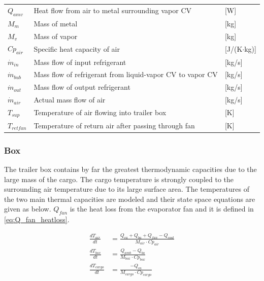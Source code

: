 \begin{center}
\begin{tabular}{l p{10cm} l}
		$Q_{amv}$        & Heat flow from air to metal surrounding vapor CV                         & [\si{W}]                          \\
		$M_{m}$          & Mass of metal                                                            & [\si{kg}]                         \\
		$M_{v}$          & Mass of vapor                                                            & [\si{kg}]                         \\
		$Cp_{air}$       & Specific heat capacity of air                                            & [\si{J}/(\si{K}$ \cdot $\si{kg})] \\
		$\dot{m}_{in} $  & Mass flow of input refrigerant                                           & [\si{kg}/\si{s}]                  \\
		$\dot{m}_{bub} $ & Mass flow of refrigerant from liquid-vapor CV to vapor CV                & [\si{kg}/\si{s}]                  \\
		$\dot{m}_{out} $ & Mass flow of output refrigerant                                          & [\si{kg}/\si{s}]                  \\
		$\dot{m}_{air}$  & Actual mass flow of air                                                  & [\si{kg}/\si{s}]                  \\
		$T_{sup} $       & Temperature of air flowing into trailer box                              & [\si{K}]                          \\
		$T_{retfan}$     & Temperature of return air after passing through fan                      & [\si{K}]
	\end{tabular}
\end{center}


\subsubsection{Box}
The trailer box contains by far the greatest thermodynamic capacities due to the large mass of the cargo. The cargo temperature is strongly coupled to the surrounding air temperature due to its large surface area. The temperatures of the two main thermal capacities are modeled and their state space equations are given as below. $Q_{fan}$ is the heat loss from the evaporator fan and it is defined in \cref{eq:Q_fan_heatloss}.

\begin{align}
	\frac{dT_{air}}{dt} & = \frac{Q_{ca} + Q_{ba} + Q_{fan} -Q_{cool}}{M_{air} \cdot Cp_{air}} \\
	\frac{dT_{box}}{dt} & = \frac{Q_{amb} - Q_{ba}}{M_{box} \cdot Cp_{box}} \\
	\frac{dT_{cargo}}{dt} & = \frac{-Q_{ca}}{M_{cargo} \cdot Cp_{cargo}}
\end{align}

